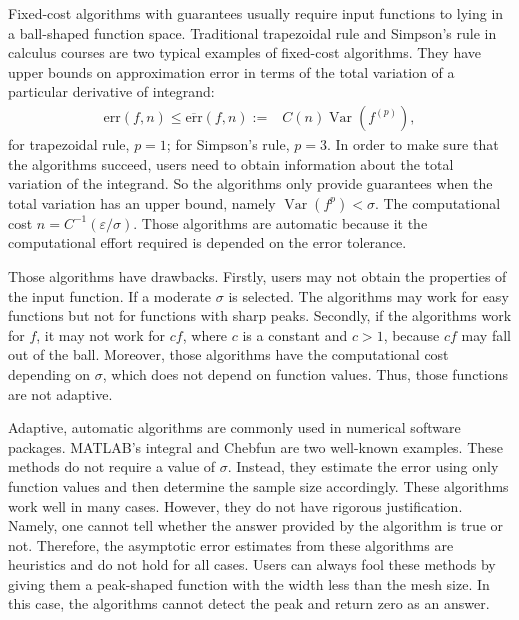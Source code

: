 \documentclass{iitthesis}
\DeclareMathOperator{\Var}{Var}
\theoremstyle{definition}
\theoremstyle{remark}
\begin{document}
\label{secgua}

Fixed-cost algorithms with guarantees usually require input functions to lying in a ball-shaped function space. Traditional trapezoidal rule and Simpson's rule in calculus courses are two typical examples of fixed-cost algorithms. They have upper bounds on approximation error in terms of the total variation of a particular derivative of integrand:
\begin{align}\label{errorsimple}
    \text{err}(f,n)\le\overline{\text{err}}(f,n):=&C(n)\Var(f^{(p)}),
\end{align}
for trapezoidal rule, $p=1$; for Simpson's rule, $p=3$. In order to make sure that the algorithms succeed, users need to obtain information about the total variation of the integrand. So the algorithms only provide guarantees when the total variation has an upper bound, namely $\Var(f^{p})<\sigma$. The computational cost $n=C^{-1}(\varepsilon/\sigma)$. Those algorithms are automatic because it the computational effort required is depended on the error tolerance.

Those algorithms have drawbacks. Firstly, users may not obtain the properties of the input function. If a moderate $\sigma$ is selected. The algorithms may work for easy functions but not for functions with sharp peaks. Secondly, if the algorithms work for $f$, it may not work for $cf$, where $c$ is a constant and $c>1$, because $cf$ may fall out of the ball. Moreover, those algorithms have the computational cost depending on $\sigma$, which does not depend on function values. Thus, those functions are not adaptive.

\label{secada}

Adaptive, automatic algorithms are commonly used in numerical software packages. MATLAB's integral and Chebfun are two well-known examples. These methods do not require a value of $\sigma$. Instead, they estimate the error using only function values and then determine the sample size accordingly. These algorithms work well in many cases. However, they do not have rigorous justification. Namely, one cannot tell whether the answer provided by the algorithm is true or not. Therefore, the asymptotic error estimates from these algorithms are heuristics and do not hold for all cases. Users can always fool these methods by giving them a peak-shaped function with the width less than the mesh size. In this case, the algorithms cannot detect the peak and return zero as an answer.
\end{document}
